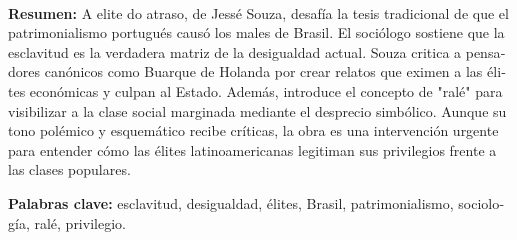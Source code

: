 \documentclass{article}
\begin{document}
\begin{textblock*}{68mm}
{\begin{minipage}[t]{68mm}
{\large
\href{https://bsky.app/intent/compose?text=https%3A%2F%2Far.pinterest.com%2Fpin%2F719239002970177904%2F}{}~
\href{mailto:?subject=Rese%C3%B1a%20bibliogr%C3%A1fica&body=https%3A%2F%2Far.pinterest.com%2Fpin%2F719239002970177904%2F}{}~
\href{https://www.facebook.com/sharer/sharer.php?u=https%3A%2F%2Far.pinterest.com%2Fpin%2F719239002970177904%2F}{}~
\href{https://www.linkedin.com/sharing/share-offsite/?url=https%3A%2F%2Far.pinterest.com%2Fpin%2F719239002970177904%2F}{}~
\href{https://www.reddit.com/submit?url=https%3A%2F%2Far.pinterest.com%2Fpin%2F719239002970177904%2F&title=Rese%C3%B1a%20bibliogr%C3%A1fica}{}~
\href{https://www.researchgate.net/search?q=Rese%C3%B1a%20bibliogr%C3%A1fica}{}~
\href{https://t.me/share/url?url=https%3A%2F%2Far.pinterest.com%2Fpin%2F719239002970177904%2F&text=Rese%C3%B1a%20bibliogr%C3%A1fica}{}~
\href{https://wa.me/?text=https%3A%2F%2Far.pinterest.com%2Fpin%2F719239002970177904%2F}{}~
\href{https://twitter.com/intent/tweet?url=https%3A%2F%2Far.pinterest.com%2Fpin%2F719239002970177904%2F&text=Rese%C3%B1a%20bibliogr%C3%A1fica}{}
}\par
\end{minipage}%
}%
\end{textblock*}


\begin{tcolorbox}[colback=brown!8!white,colframe=brown!8!white,boxrule=0pt,arc=2pt,left=4pt,right=4pt,top=3pt,bottom=3pt,before skip=4pt,after skip=4pt]
\begin{otherlanguage}{spanish}
\sffamily\small \textbf{Resumen:} A elite do atraso, de Jessé Souza, desafía la tesis tradicional de que el patrimonialismo portugués causó los males de Brasil. El sociólogo sostiene que la esclavitud es la verdadera matriz de la desigualdad actual. Souza critica a pensadores canónicos como Buarque de Holanda por crear relatos que eximen a las élites económicas y culpan al Estado. Además, introduce el concepto de "ralé" para visibilizar a la clase social marginada mediante el desprecio simbólico. Aunque su tono polémico y esquemático recibe críticas, la obra es una intervención urgente para entender cómo las élites latinoamericanas legitiman sus privilegios frente a las clases populares.
\par\smallskip\noindent\textbf{Palabras clave:} esclavitud, desigualdad, élites, Brasil, patrimonialismo, sociología, ralé, privilegio.
\end{otherlanguage}
\end{tcolorbox}
\end{document}
